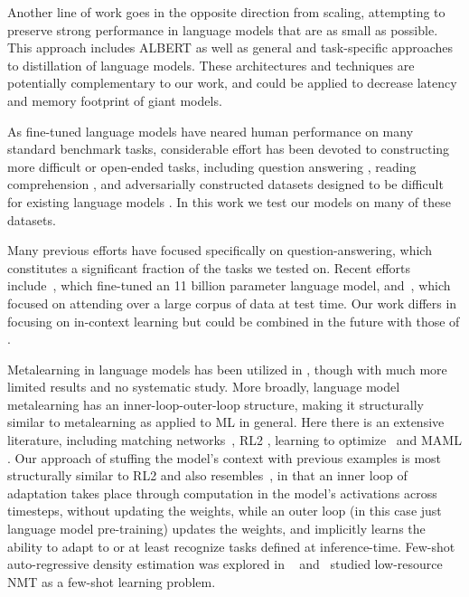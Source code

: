 Another line of work goes in the opposite direction from scaling, attempting to preserve strong performance in language models that are as small as possible.  This approach includes ALBERT \cite{lan2019albert} as well as general \cite{hinton2015distilling} and task-specific \cite{sanh2019distilbert,jiao2019tinybert,yoon2016sequencedistil} approaches to distillation of language models.  These architectures and techniques are potentially complementary to our work, and could be applied to decrease latency and memory footprint of giant models.

As fine-tuned language models have neared human performance on many standard benchmark tasks, considerable effort has been devoted to constructing more difficult or open-ended tasks, including question answering \cite{Kwiatkowski2019nq,Iyyer2014quiz, Clark2018ThinkYH,Mihaylov2018CanAS}, reading comprehension \cite{choi2018quac,reddy2019coqa}, and adversarially constructed datasets designed to be difficult for existing language models \cite{sakaguchi2019winogrande,nie2019adversarial}.  In this work we test our models on many of these datasets.

Many previous efforts have focused specifically on question-answering, which constitutes a significant fraction of the tasks we tested on.  Recent efforts include~\citep{raffel2019t5, roberts2020much}, which fine-tuned an 11 billion parameter language model, and~\cite{guu2020realm}, which focused on attending over a large corpus of data at test time.  Our work differs in focusing on in-context learning but could be combined in the future with those of \cite{guu2020realm,lewis2020retrieval}.

Metalearning in language models has been utilized in \cite{radford2019language}, though with much more limited results and no systematic study.  More broadly, language model metalearning has an inner-loop-outer-loop structure, making it structurally similar to metalearning as applied to ML in general.  Here there is an extensive literature, including matching networks~\citep{vinyals2016matching}, RL2 \cite{Duan2016RL2FR},  learning to optimize~\citep{ravi2016optimization, andrychowicz2016learning, li2017learning} and MAML \cite{Finn2017ModelAgnosticMF}.  Our approach of stuffing the model’s context with previous examples is most structurally similar to RL2 and also resembles~\cite{hochreiter2001learning}, in that an inner loop of adaptation takes place through computation in the model’s activations across timesteps, without updating the weights, while an outer loop (in this case just language model pre-training) updates the weights, and implicitly learns the ability to adapt to or at least recognize tasks defined at inference-time. Few-shot auto-regressive density estimation was explored in ~\cite{reed2017few} and~\cite{gu2018meta} studied low-resource NMT as a few-shot learning problem.

